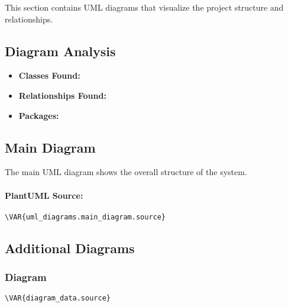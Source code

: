 \documentclass[11pt,a4paper]{article}
\begin{document}
This section contains UML diagrams that visualize the project structure and relationships.

\subsection{Diagram Analysis}

\begin{itemize}
    \item \textbf{Classes Found:} 
    \item \textbf{Relationships Found:} 
    \item \textbf{Packages:} 
\end{itemize}

\subsection{Main Diagram}

The main UML diagram shows the overall structure of the system.

\paragraph{PlantUML Source:}
\begin{lstlisting}[language={}]
\VAR{uml_diagrams.main_diagram.source}
\end{lstlisting}

\subsection{Additional Diagrams}

\subsubsection{ Diagram}

\begin{lstlisting}[language={}]
\VAR{diagram_data.source}
\end{lstlisting}
\end{document}
